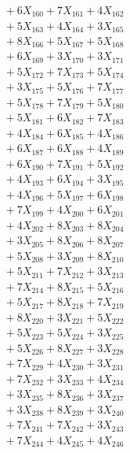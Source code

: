 \documentclass[a4paper,10pt]{article}
\begin{document}
{\begin{align}
&\;  + 6 X_{160} + 7 X_{161} + 4 X_{162} \\[0.3ex]
&\;  + 5 X_{163} + 4 X_{164} + 3 X_{165} \\[0.3ex]
&\;  + 8 X_{166} + 5 X_{167} + 5 X_{168} \\[0.3ex]
&\;  + 6 X_{169} + 3 X_{170} + 3 X_{171} \\[0.3ex]
&\;  + 5 X_{172} + 7 X_{173} + 5 X_{174} \\[0.3ex]
&\;  + 3 X_{175} + 5 X_{176} + 7 X_{177} \\[0.3ex]
&\;  + 5 X_{178} + 7 X_{179} + 5 X_{180} \\[0.3ex]
&\;  + 5 X_{181} + 6 X_{182} + 7 X_{183} \\[0.3ex]
&\;  + 4 X_{184} + 6 X_{185} + 4 X_{186} \\[0.3ex]
&\;  + 6 X_{187} + 6 X_{188} + 4 X_{189} \\[0.5ex]\allowbreak
&\;  + 6 X_{190} + 7 X_{191} + 5 X_{192} \\[0.3ex]
&\;  + 4 X_{193} + 6 X_{194} + 3 X_{195} \\[0.3ex]
&\;  + 4 X_{196} + 5 X_{197} + 6 X_{198} \\[0.3ex]
&\;  + 7 X_{199} + 4 X_{200} + 6 X_{201} \\[0.3ex]
&\;  + 4 X_{202} + 8 X_{203} + 8 X_{204} \\[0.3ex]
&\;  + 3 X_{205} + 8 X_{206} + 8 X_{207} \\[0.3ex]
&\;  + 5 X_{208} + 3 X_{209} + 8 X_{210} \\[0.3ex]
&\;  + 5 X_{211} + 7 X_{212} + 3 X_{213} \\[0.3ex]
&\;  + 7 X_{214} + 8 X_{215} + 5 X_{216} \\[0.3ex]
&\;  + 5 X_{217} + 8 X_{218} + 7 X_{219} \\[0.5ex]\allowbreak
&\;  + 8 X_{220} + 3 X_{221} + 5 X_{222} \\[0.3ex]
&\;  + 5 X_{223} + 5 X_{224} + 3 X_{225} \\[0.3ex]
&\;  + 5 X_{226} + 8 X_{227} + 3 X_{228} \\[0.3ex]
&\;  + 7 X_{229} + 4 X_{230} + 3 X_{231} \\[0.3ex]
&\;  + 7 X_{232} + 3 X_{233} + 4 X_{234} \\[0.3ex]
&\;  + 3 X_{235} + 8 X_{236} + 3 X_{237} \\[0.3ex]
&\;  + 3 X_{238} + 8 X_{239} + 3 X_{240} \\[0.3ex]
&\;  + 7 X_{241} + 7 X_{242} + 3 X_{243} \\[0.3ex]
&\;  + 7 X_{244} + 4 X_{245} + 4 X_{246} \\[0.3ex]

\end{align}}
\end{document}
